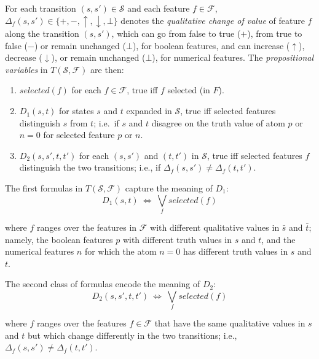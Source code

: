 \documentclass[letterpaper]{article} %
\newcommand{\F}{\mathcal{F}}
\renewcommand{\S}{\mathcal{S}}
\begin{document}
For each transition  $(s, s') \in \S$ and each  feature $f \in \F$,
$\Delta_f(s, s') \in \{+, -, \uparrow, \downarrow, \bot\}$  denotes the
\emph{qualitative change of value} of feature $f$ along the transition $(s, s')$,
which can go from false to true ($+$), from true to false ($-$) or remain
unchanged ($\bot$), for boolean features, and can increase ($\uparrow$),
decrease ($\downarrow$), or remain unchanged ($\bot$), for numerical features.
The \emph{propositional variables} in $T(\S,\F)$ are then:
\begin{enumerate}[{\small$\bullet$}]
  \item $selected(f)$ for each $f \in \F$, true iff $f$ selected (in $F$).
  \item $D_1(s,t)$ for states $s$ and $t$ expanded in $\S$,  true iff
    selected features distinguish $s$ from $t$; i.e.\ if $s$ and $t$ disagree
    on  the truth value of atom  $p$ or  $n=0$ for   selected  feature $p$ or $n$.
  \item $D_2(s, s', t, t')$ for each $(s, s')$ and $(t, t')$ in $\S$,
    true iff selected features $f$ distinguish the two transitions; i.e., if
    $\Delta_f(s, s')\not=\Delta_f(t,t')$. 
\end{enumerate}

\medskip
\noindent The first formulas in $T(\S,\F)$ capture the meaning of $D_1$:
%  
\begin{equation}
  \label{eq:d1}
  D_1(s, t) \ \Leftrightarrow\ \textstyle \bigvee_{f}  selected(f)
\end{equation}

\noindent where $f$ ranges over the features in $\F$ with  different qualitative
values in $\bar{s}$ and $\bar{t}$; namely, the  boolean features $p$ with different
truth values in $s$ and $t$, and the numerical features $n$ for which 
the atom $n=0$ has different truth values in $s$ and $t$. 

The second class of  formulas encode the meaning of $D_2$:
%
\begin{equation}
  \label{eq:d2}
  D_2(s, s', t, t') \ \Leftrightarrow\ \textstyle\bigvee_f  selected(f)
\end{equation}

\noindent where $f$ ranges over the features $f \in \F$ that have the same
qualitative values in $s$ and $t$ but which change differently in the two
transitions; i.e., $\Delta_f(s, s') \neq \Delta_f(t, t')$.
\end{document}
